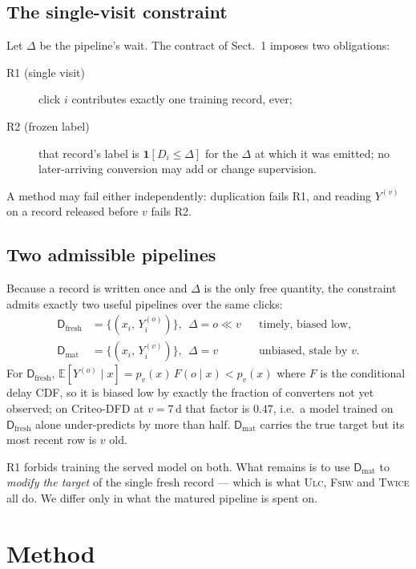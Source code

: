\documentclass[runningheads]{llncs}
\newcommand{\ind}{\mathbf{1}}
\newcommand{\Yo}{Y^{(o)}}
\newcommand{\Yv}{Y^{(v)}}
\begin{document}
\subsection{The single-visit constraint}

Let $\Delta$ be the pipeline's wait. The contract of Sect.~1 imposes two obligations:
\begin{description}
\item[R1 (single visit)] click $i$ contributes exactly one training record, ever;
\item[R2 (frozen label)] that record's label is $\ind[D_i \le \Delta]$ for the $\Delta$ at which it
was emitted; no later-arriving conversion may add or change supervision.
\end{description}
A method may fail either independently: duplication fails R1, and reading $\Yv$ on a record released
before $v$ fails R2.

\subsection{Two admissible pipelines}

Because a record is written once and $\Delta$ is the only free quantity, the constraint admits
exactly two useful pipelines over the same clicks:
\begin{align}
\mathsf{D}_{\text{fresh}} &= \{(x_i,\, \Yo_i)\},\ \ \Delta = o \ll v
  &&\text{timely, biased low,}\\
\mathsf{D}_{\text{mat}} &= \{(x_i,\, \Yv_i)\},\ \ \Delta = v
  &&\text{unbiased, stale by } v .
\end{align}
For $\mathsf{D}_{\text{fresh}}$, $\mathbb{E}[\Yo \mid x] = p_v(x)\,F(o \mid x) < p_v(x)$ where $F$
is the conditional delay CDF, so it is biased low by exactly the fraction of converters not yet
observed; on Criteo-DFD at $v=7$\,d that factor is $0.47$, i.e.\ a model trained on
$\mathsf{D}_{\text{fresh}}$ alone under-predicts by more than half. $\mathsf{D}_{\text{mat}}$
carries the true target but its most recent row is $v$ old.

R1 forbids training the served model on both. What remains is to use $\mathsf{D}_{\text{mat}}$ to
\emph{modify the target} of the single fresh record --- which is what \textsc{Ulc}, \textsc{Fsiw}
and \textsc{Twice} all do. We differ only in what the matured pipeline is spent on.

\section{Method}\label{sec:method}
\end{document}
